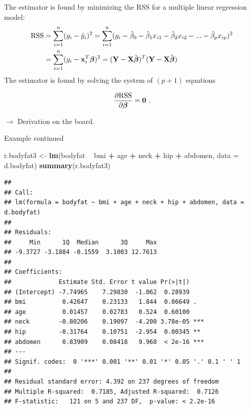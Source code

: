 \documentclass[10pt,ignorenonframetext,]{beamer}
\newenvironment{Shaded}{\begin{snugshade}}{\end{snugshade}}
\newcommand{\KeywordTok}[1]{\textcolor[rgb]{0.13,0.29,0.53}{\textbf{#1}}}
\newcommand{\DataTypeTok}[1]{\textcolor[rgb]{0.13,0.29,0.53}{#1}}
\newcommand{\StringTok}[1]{\textcolor[rgb]{0.31,0.60,0.02}{#1}}
\newcommand{\OperatorTok}[1]{\textcolor[rgb]{0.81,0.36,0.00}{\textbf{#1}}}
\newcommand{\NormalTok}[1]{#1}
\begin{document}
\begin{frame}

The estimator is found by minimizing the RSS for a multiple linear
regression model:
\[\begin{aligned} \text{RSS} &=\sum_{i=1}^n (y_i - \hat y_i)^2 = \sum_{i=1}^n (y_i - \hat \beta_0 - \hat \beta_1 x_{i1} - \hat \beta_2 x_{i2} -...-\hat \beta_p x_{ip} )^2 \\
&= \sum_{i=1}^n (y_i-{\bf x}_i^T \boldsymbol \beta)^2=({\bf Y}-{\bf X}\hat{\boldsymbol{\beta}})^T({\bf Y}-{\bf X}\hat{\boldsymbol{\beta}})\end{aligned}\]
The estimator is found by solving the system of \((p+1)\) equations

\[\frac{\partial \text{RSS}}{\partial \boldsymbol \beta}={\bf 0} \ .\]

\(\rightarrow\) Derivation on the board.

\end{frame}

\begin{frame}[fragile]

\begin{block}{Example continued}

\tiny

\begin{Shaded}
\begin{Highlighting}[]
\NormalTok{r.bodyfat3 <-}\StringTok{ }\KeywordTok{lm}\NormalTok{(bodyfat }\OperatorTok{~}\StringTok{ }\NormalTok{bmi }\OperatorTok{+}\StringTok{ }\NormalTok{age }\OperatorTok{+}\StringTok{ }\NormalTok{neck }\OperatorTok{+}\StringTok{ }\NormalTok{hip }\OperatorTok{+}\StringTok{ }\NormalTok{abdomen, }\DataTypeTok{data =}\NormalTok{ d.bodyfat)}
\KeywordTok{summary}\NormalTok{(r.bodyfat3)}
\end{Highlighting}
\end{Shaded}

\begin{verbatim}
## 
## Call:
## lm(formula = bodyfat ~ bmi + age + neck + hip + abdomen, data = d.bodyfat)
## 
## Residuals:
##     Min      1Q  Median      3Q     Max 
## -9.3727 -3.1884 -0.1559  3.1003 12.7613 
## 
## Coefficients:
##             Estimate Std. Error t value Pr(>|t|)    
## (Intercept) -7.74965    7.29830  -1.062  0.28939    
## bmi          0.42647    0.23133   1.844  0.06649 .  
## age          0.01457    0.02783   0.524  0.60100    
## neck        -0.80206    0.19097  -4.200 3.78e-05 ***
## hip         -0.31764    0.10751  -2.954  0.00345 ** 
## abdomen      0.83909    0.08418   9.968  < 2e-16 ***
## ---
## Signif. codes:  0 '***' 0.001 '**' 0.01 '*' 0.05 '.' 0.1 ' ' 1
## 
## Residual standard error: 4.392 on 237 degrees of freedom
## Multiple R-squared:  0.7185, Adjusted R-squared:  0.7126 
## F-statistic:   121 on 5 and 237 DF,  p-value: < 2.2e-16
\end{verbatim}

\normalsize

\end{block}

\end{frame}
\end{document}
